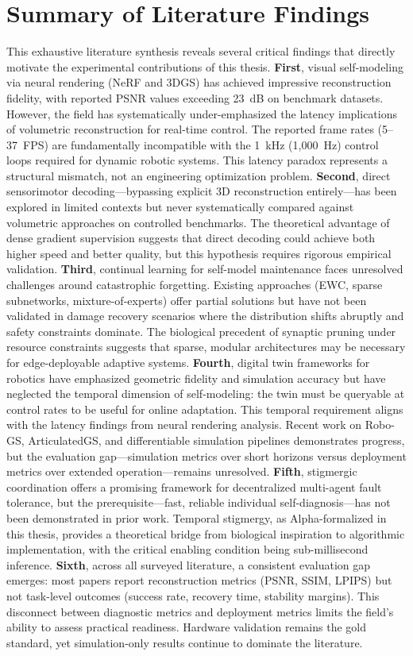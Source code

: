 \documentclass[12pt,a4paper,oneside]{report}
\begin{document}
\section{Summary of Literature Findings}
This exhaustive literature synthesis reveals several critical findings that directly motivate the experimental contributions of this thesis.
\textbf{First}, visual self-modeling via neural rendering (NeRF and 3DGS) has achieved impressive reconstruction fidelity, with reported PSNR values exceeding 23~dB on benchmark datasets. However, the field has systematically under-emphasized the latency implications of volumetric reconstruction for real-time control. The reported frame rates (5--37~FPS) are fundamentally incompatible with the 1~kHz (1,000~Hz) control loops required for dynamic robotic systems. This latency paradox represents a structural mismatch, not an engineering optimization problem.
\textbf{Second}, direct sensorimotor decoding---bypassing explicit 3D reconstruction entirely---has been explored in limited contexts but never systematically compared against volumetric approaches on controlled benchmarks. The theoretical advantage of dense gradient supervision suggests that direct decoding could achieve both higher speed and better quality, but this hypothesis requires rigorous empirical validation.
\textbf{Third}, continual learning for self-model maintenance faces unresolved challenges around catastrophic forgetting. Existing approaches (EWC, sparse subnetworks, mixture-of-experts) offer partial solutions but have not been validated in damage recovery scenarios where the distribution shifts abruptly and safety constraints dominate. The biological precedent of synaptic pruning under resource constraints suggests that sparse, modular architectures may be necessary for edge-deployable adaptive systems.
\textbf{Fourth}, digital twin frameworks for robotics have emphasized geometric fidelity and simulation accuracy but have neglected the temporal dimension of self-modeling: the twin must be queryable at control rates to be useful for online adaptation. This temporal requirement aligns with the latency findings from neural rendering analysis. Recent work on Robo-GS, ArticulatedGS, and differentiable simulation pipelines demonstrates progress, but the evaluation gap---simulation metrics over short horizons versus deployment metrics over extended operation---remains unresolved.
\textbf{Fifth}, stigmergic coordination offers a promising framework for decentralized multi-agent fault tolerance, but the prerequisite---fast, reliable individual self-diagnosis---has not been demonstrated in prior work. Temporal stigmergy, as Alpha-formalized in this thesis, provides a theoretical bridge from biological inspiration to algorithmic implementation, with the critical enabling condition being sub-millisecond inference.
\textbf{Sixth}, across all surveyed literature, a consistent evaluation gap emerges: most papers report reconstruction metrics (PSNR, SSIM, LPIPS) but not task-level outcomes (success rate, recovery time, stability margins). This disconnect between diagnostic metrics and deployment metrics limits the field's ability to assess practical readiness. Hardware validation remains the gold standard, yet simulation-only results continue to dominate the literature.
\end{document}
